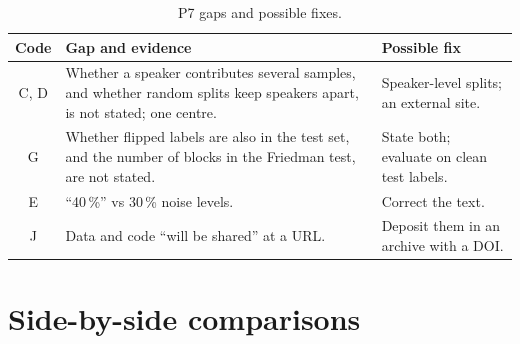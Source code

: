 \documentclass[11pt,a4paper]{article}
\begin{document}
\begin{table}[H]
\centering\footnotesize
\caption{P7 gaps and possible fixes.}
\begin{tabularx}{\textwidth}{c Y Y}
\toprule
Code & Gap and evidence & Possible fix \\
\midrule
C, D & Whether a speaker contributes several samples, and whether random splits keep speakers apart, is not stated; one centre. & Speaker-level splits; an external site. \\
G & Whether flipped labels are also in the test set, and the number of blocks in the Friedman test, are not stated. & State both; evaluate on clean test labels. \\
E & ``40\,\%'' vs 30\,\% noise levels. & Correct the text. \\
J & Data and code ``will be shared'' at a URL. & Deposit them in an archive with a DOI. \\
\bottomrule
\end{tabularx}
\end{table}

\section{Side-by-side comparisons}
\label{sec:side}
\end{document}
